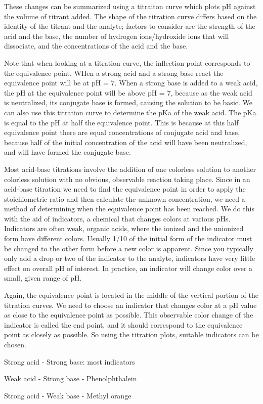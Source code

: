 \documentclass[../chem.tex]{subfiles}
\begin{document}
These changes can be summarized using a titraiton curve which plots pH against the volume of titrant added. The shape of the titration curve 
differs based on the identity of the titrant and the analyte; factors to consider are the strength of the acid and the base, the number of hydrogen ions/hydroxide ions that will dissociate, and the concentrations of the acid and the base.

Note that when looking at a titration curve, the inflection point corresponds to the equivalence point. WHen a strong acid and a strong base 
react the equivalence point will be at pH = 7. When a strong base is added to a weak acid, the pH at the equivalence point will be above pH = 7,
because as the weak acid is neutralized, its conjugate base is formed, causing the solution to be basic. We can also use this titration curve to determine the pKa of the 
weak acid. The pKa is equal to the pH at half the equivalence point. This is because at this half equivalence point there are equal concentrations of 
conjugate acid and base, because half of the initial concentration of the acid will have been neutralized, and will have formed the conjugate base.

Most acid-base titrations involve the addition of one colorless solution to another colorless solution with no obvious, observable reaction taking place.
Since in an acid-base titration we need to find the equivalence point in order to apply the stoichiometric ratio and then calculate the unknown concentration, we need a method 
of determining when the equivalence point has been reached. We do this with the aid of indicators, a chemical that changes colors at various pHs. Indicators are 
often weak, organic acids, where the ionized and the unionized form have different colors. Usually 1/10 of the initial form of the indicator must be changed to the other form before a new color 
is apparent. Since you typically only add a drop or two of the indicator to the analyte, indicators have very little effect on overall pH of interest. In practice,
an indicator will change color over a small, given range of pH.

Again, the equivalence point is located in the middle of the vertical portion of the titration curves. We need to choose an indicator that changes color 
at a pH value as close to the equivalence point as possible. This observable color change of the indicator is called the end point, and it should correspond 
to the equivalence point as closely as possible. So using the titration plots, suitable indicators can be chosen.
\begin{center}
    Strong acid - Strong base: most indicators

    Weak acid - Strong base - Phenolphthalein

    Strong acid - Weak base - Methyl orange
\end{center}
\end{document}
